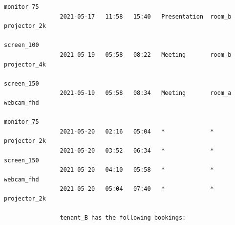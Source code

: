 \documentclass{article}
\begin{document}
\begin{Verbatim}[gobble=8]
                                                                    monitor_75
                2021-05-17   11:58   15:40   Presentation  room_b   projector_2k
                                                                    screen_100
                2021-05-19   05:58   08:22   Meeting       room_b   projector_4k
                                                                    screen_150
                2021-05-19   05:58   08:34   Meeting       room_a   webcam_fhd
                                                                    monitor_75
                2021-05-20   02:16   05:04   *             *        projector_2k
                2021-05-20   03:52   06:34   *             *        screen_150
                2021-05-20   04:10   05:58   *             *        webcam_fhd
                2021-05-20   05:04   07:40   *             *        projector_2k
                
                tenant_B has the following bookings:
                

\end{Verbatim}
\end{document}
